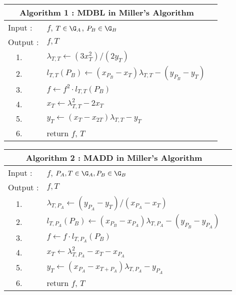\begin{center}
\begin{table}[ht]
{
\label{table1}
\begin{center}
\begin{tabular}{llc}
\multicolumn{2}{c}{\bf Algorithm 1 : MDBL in Miller's Algorithm}\\
\hline\hline
Input : & $f$, $T\in \G_A$, $P_B\in \G_B$\\
Output : & $f,T$\\
\hline
\ \ 1. &$\lambda _{T,T} \leftarrow (3x_{T}^2)/(2y_{T})$ \\
\ \ 2. &$l_{T,T}(P_B) \leftarrow (x_{P_B}-x_{T})\lambda _{T,T}- (y_{P_B}-y_{T})$\\
\ \ 3. &$f\leftarrow f^2\cdot l_{T,T}(P_B)$ \\
\ \ 4. &$x_{T} \leftarrow \lambda _{T,T}^2-2x_{T}$\\
\ \ 5. &$y_{T} \leftarrow (x_{T}-x_{2T})\lambda _{T,T}-y_{T}$\\
\ \ 6. &return $f$, $T$\\
\hline\hline
\end{tabular}%
\end{center}
}
\end{table}
\end{center}
\begin{center}
\begin{table}[ht]
\label{table2}
\begin{center}
\begin{tabular}{llc}
\multicolumn{2}{c}{\bf Algorithm 2 : MADD in Miller's Algorithm}\\ 
\hline\hline
Input : & $f$, $P_A,T\in \G_A, P_B\in \G_B$\\
Output : & $f,T$\\
\hline
\ \ 1. &$\lambda _{T,P_A} \leftarrow (y_{P_A}-y_{T})/(x_{P_A}-x_{T})$ \\
\ \ 2. &$l_{T,P_A}(P_B) \leftarrow (x_{P_B}-x_{P_A})\lambda _{T,P_A}- (y_{P_B}-y_{P_A})$\\
\ \ 3. &$f\leftarrow f\cdot l_{T,P_A}(P_B)$ \\
\ \ 4. &$x_{T} \leftarrow \lambda _{T,P_A}^2-x_{T}-x_{P_A}$\\
\ \ 5. &$y_{T} \leftarrow (x_{P_A}-x_{T+P_A})\lambda _{T,P_A}-y_{P_A}$\\
\ \ 6. &return $f$, $T$\\
\hline\hline
\end{tabular}%
\end{center}
\end{table}
\end{center}
